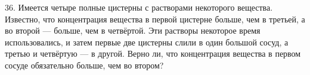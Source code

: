 36. Имеется четыре полные цистерны с растворами некоторого вещества. Известно, что концентрация вещества в первой цистерне больше, чем в третьей, а во второй --- больше, чем в четвёртой. Эти растворы некоторое время использовались, и затем первые две цистерны слили в один большой сосуд, а третью и четвёртую --- в другой. Верно ли, что концентрация вещества в первом сосуде обязательно больше, чем во втором?\\
